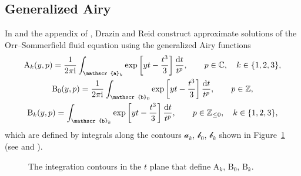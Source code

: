 \documentclass[pdftex]{sigma}
\newcommand{\Z}{\mathbb{Z}}
\newcommand{\C}{\mathbb{C}}
\numberwithin{equation}{section}
\begin{document}
\subsection{Generalized Airy}\label{sec:gen-airy}
%
In \cite{Reid} and the appendix of \cite{drazin-reid}, Drazin and Reid construct approximate solutions of the Orr--Sommerfield fluid equation using the generalized Airy functions
\begin{gather*}
\mathrm{A}_k(y,p) = \frac{1}{2 \pi {\rm i}}\int_{\mathscr{a}_k} \exp\left[yt-\frac{t^3}{3}\right] \frac{{\rm d}t}{t^p} ,\qquad p \in \C ,\quad k \in \{1,2,3\}, \\
\mathrm{B}_0(y,p) = \frac{1}{2 \pi {\rm i}}\int_{\mathscr{b}_0} \exp\left[yt-\frac{t^3}{3}\right] \frac{{\rm d}t}{t^p} ,\qquad p \in \Z ,\\
\mathrm{B}_k(y,p) = \int_{\mathscr{b}_k} \exp\left[yt-\frac{t^3}{3}\right] \frac{{\rm d}t}{t^p} ,\qquad p \in \Z_{\le 0},\quad k \in \{1,2,3\},
\end{gather*}
which are defined by integrals along the contours $\mathscr{a}_k$, $\mathscr{b}_0$, $\mathscr{b}_k$ shown in Figure~\ref{fig:path-generalized-Airy} (see \cite{drazin-reid} and \cite[Section~9.13\,(ii)]{dlmf}).
\begin{figure}[!ht]
\centering
\newcommand{\apathcolor}{ietcoast}
\newcommand{\bpathcolor}{black}
\caption{The integration contours in the $t$ plane that define $\mathrm{A}_k$, $\mathrm{B}_0$, $\mathrm{B}_k$.}\label{fig:path-generalized-Airy}
\end{figure}
\end{document}
